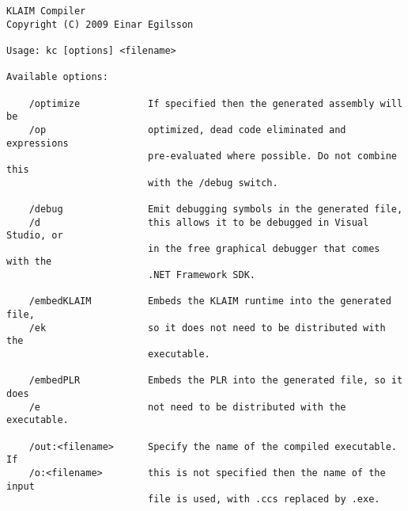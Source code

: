 	\begin{footnotesize}
	\begin{verbatim}
KLAIM Compiler
Copyright (C) 2009 Einar Egilsson

Usage: kc [options] <filename>

Available options:

    /optimize            If specified then the generated assembly will be
    /op                  optimized, dead code eliminated and expressions
                         pre-evaluated where possible. Do not combine this
                         with the /debug switch.
    
    /debug               Emit debugging symbols in the generated file,
    /d                   this allows it to be debugged in Visual Studio, or
                         in the free graphical debugger that comes with the
                         .NET Framework SDK.

    /embedKLAIM          Embeds the KLAIM runtime into the generated file, 
    /ek                  so it does not need to be distributed with the 
                         executable.

    /embedPLR            Embeds the PLR into the generated file, so it does
    /e                   not need to be distributed with the executable.

    /out:<filename>      Specify the name of the compiled executable. If 
    /o:<filename>        this is not specified then the name of the input
                         file is used, with .ccs replaced by .exe.

	\end{verbatim}
	\end{footnotesize}
